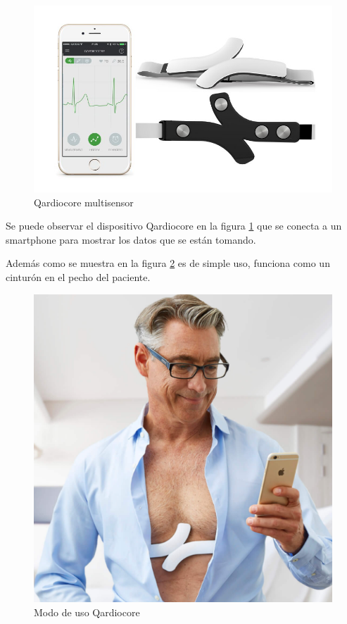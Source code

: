 \begin{figure}[H]
	\centering
	\includegraphics[scale=0.5]{figuras/estadoarte/qardio/qardio.jpg}
	\caption{Qardiocore multisensor}
	\label{qardio1}
\end{figure}

Se puede observar el dispositivo Qardiocore en la figura \ref{qardio1} que se conecta a un smartphone para mostrar los datos que se están tomando.

\newpage
Además como se muestra en la figura \ref{qardio2} es de simple uso, funciona como un cinturón en el pecho del paciente.

\begin{figure}[H]
	\centering
	\includegraphics[scale=0.5]{figuras/estadoarte/qardio/wear.png}
	\caption{Modo de uso Qardiocore}
	\label{qardio2}
\end{figure}


